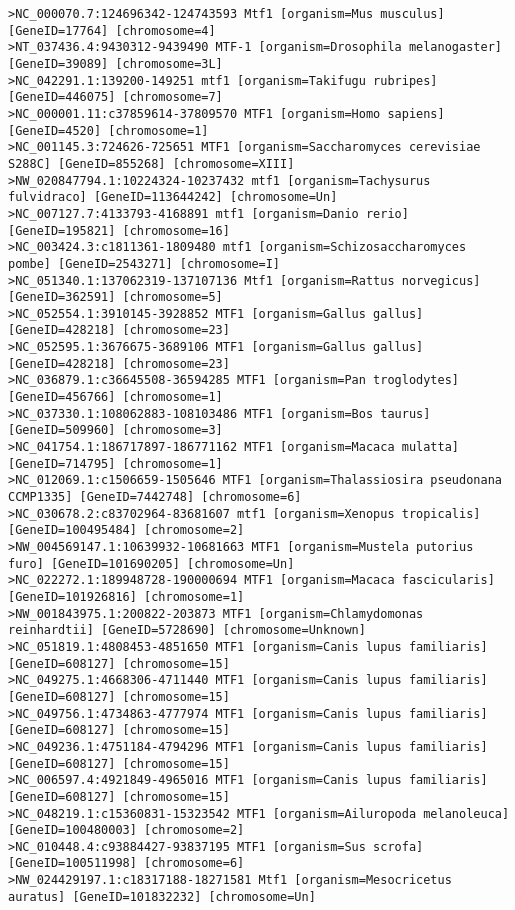 \begin{lstlisting}[basicstyle=\tiny\ttfamily]
>NC_000070.7:124696342-124743593 Mtf1 [organism=Mus musculus] [GeneID=17764] [chromosome=4]
>NT_037436.4:9430312-9439490 MTF-1 [organism=Drosophila melanogaster] [GeneID=39089] [chromosome=3L]
>NC_042291.1:139200-149251 mtf1 [organism=Takifugu rubripes] [GeneID=446075] [chromosome=7]
>NC_000001.11:c37859614-37809570 MTF1 [organism=Homo sapiens] [GeneID=4520] [chromosome=1]
>NC_001145.3:724626-725651 MTF1 [organism=Saccharomyces cerevisiae S288C] [GeneID=855268] [chromosome=XIII]
>NW_020847794.1:10224324-10237432 mtf1 [organism=Tachysurus fulvidraco] [GeneID=113644242] [chromosome=Un]
>NC_007127.7:4133793-4168891 mtf1 [organism=Danio rerio] [GeneID=195821] [chromosome=16]
>NC_003424.3:c1811361-1809480 mtf1 [organism=Schizosaccharomyces pombe] [GeneID=2543271] [chromosome=I]
>NC_051340.1:137062319-137107136 Mtf1 [organism=Rattus norvegicus] [GeneID=362591] [chromosome=5]
>NC_052554.1:3910145-3928852 MTF1 [organism=Gallus gallus] [GeneID=428218] [chromosome=23]
>NC_052595.1:3676675-3689106 MTF1 [organism=Gallus gallus] [GeneID=428218] [chromosome=23]
>NC_036879.1:c36645508-36594285 MTF1 [organism=Pan troglodytes] [GeneID=456766] [chromosome=1]
>NC_037330.1:108062883-108103486 MTF1 [organism=Bos taurus] [GeneID=509960] [chromosome=3]
>NC_041754.1:186717897-186771162 MTF1 [organism=Macaca mulatta] [GeneID=714795] [chromosome=1]
>NC_012069.1:c1506659-1505646 MTF1 [organism=Thalassiosira pseudonana CCMP1335] [GeneID=7442748] [chromosome=6]
>NC_030678.2:c83702964-83681607 mtf1 [organism=Xenopus tropicalis] [GeneID=100495484] [chromosome=2]
>NW_004569147.1:10639932-10681663 MTF1 [organism=Mustela putorius furo] [GeneID=101690205] [chromosome=Un]
>NC_022272.1:189948728-190000694 MTF1 [organism=Macaca fascicularis] [GeneID=101926816] [chromosome=1]
>NW_001843975.1:200822-203873 MTF1 [organism=Chlamydomonas reinhardtii] [GeneID=5728690] [chromosome=Unknown]
>NC_051819.1:4808453-4851650 MTF1 [organism=Canis lupus familiaris] [GeneID=608127] [chromosome=15]
>NC_049275.1:4668306-4711440 MTF1 [organism=Canis lupus familiaris] [GeneID=608127] [chromosome=15]
>NC_049756.1:4734863-4777974 MTF1 [organism=Canis lupus familiaris] [GeneID=608127] [chromosome=15]
>NC_049236.1:4751184-4794296 MTF1 [organism=Canis lupus familiaris] [GeneID=608127] [chromosome=15]
>NC_006597.4:4921849-4965016 MTF1 [organism=Canis lupus familiaris] [GeneID=608127] [chromosome=15]
>NC_048219.1:c15360831-15323542 MTF1 [organism=Ailuropoda melanoleuca] [GeneID=100480003] [chromosome=2]
>NC_010448.4:c93884427-93837195 MTF1 [organism=Sus scrofa] [GeneID=100511998] [chromosome=6]
>NW_024429197.1:c18317188-18271581 Mtf1 [organism=Mesocricetus auratus] [GeneID=101832232] [chromosome=Un]

\end{lstlisting}
